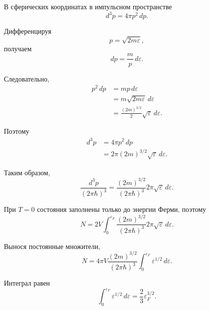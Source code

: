 \documentclass[../final.tex]{subfiles}
\begin{document}
В сферических координатах в импульсном пространстве
%
\begin{equation*}
    d^3p
    =
    4\pi p^2\,dp.
\end{equation*}

Дифференцируя
%
\begin{equation*}
    p
    =
    \sqrt{2m\varepsilon},
\end{equation*}
%
получаем
%
\begin{equation*}
    dp
    =
    \frac{m}{p}\,d\varepsilon.
\end{equation*}

Следовательно,
%
\begin{align*}
    p^2\,dp
    &=
    mp\,d\varepsilon
    \\[3pt]
    &=
    m\sqrt{2m\varepsilon}\,d\varepsilon
    \\[3pt]
    &=
    \frac{
        (2m)^{3/2}
    }{
        2
    }
    \sqrt{\varepsilon}\,d\varepsilon.
\end{align*}

Поэтому
%
\begin{align*}
    d^3p
    &=
    4\pi p^2\,dp
    \\[3pt]
    &=
    2\pi(2m)^{3/2}
    \sqrt{\varepsilon}\,d\varepsilon.
\end{align*}

Таким образом,
%
\begin{equation*}
    \frac{
        d^3p
    }{
        (2\pi\hbar)^3
    }
    =
    \frac{
        (2m)^{3/2}
    }{
        (2\pi\hbar)^3
    }
    2\pi
    \sqrt{\varepsilon}\,d\varepsilon.
\end{equation*}

При $T=0$ состояния заполнены только до энергии Ферми,
поэтому
%
\begin{equation*}
    N
    =
    2V
    \int_0^{\varepsilon_F}
    \frac{
        (2m)^{3/2}
    }{
        (2\pi\hbar)^3
    }
    2\pi
    \sqrt{\varepsilon}\,d\varepsilon.
\end{equation*}

Вынося постоянные множители,
%
\begin{equation*}
    N
    =
    4\pi V
    \frac{
        (2m)^{3/2}
    }{
        (2\pi\hbar)^3
    }
    \int_0^{\varepsilon_F}
    \varepsilon^{1/2}\,d\varepsilon.
\end{equation*}

Интеграл равен
%
\begin{equation*}
    \int_0^{\varepsilon_F}
    \varepsilon^{1/2}\,d\varepsilon
    =
    \frac{2}{3}
    \varepsilon_F^{3/2}.
\end{equation*}
\end{document}
